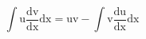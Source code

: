 \[ \int \mathrm{u} \frac{\mathrm{dv}}{\mathrm{dx}} \mathrm{dx} = 
\mathrm{uv} - \int \mathrm{v} \frac {\mathrm{du}}{\mathrm{dx}} \mathrm{dx} \]